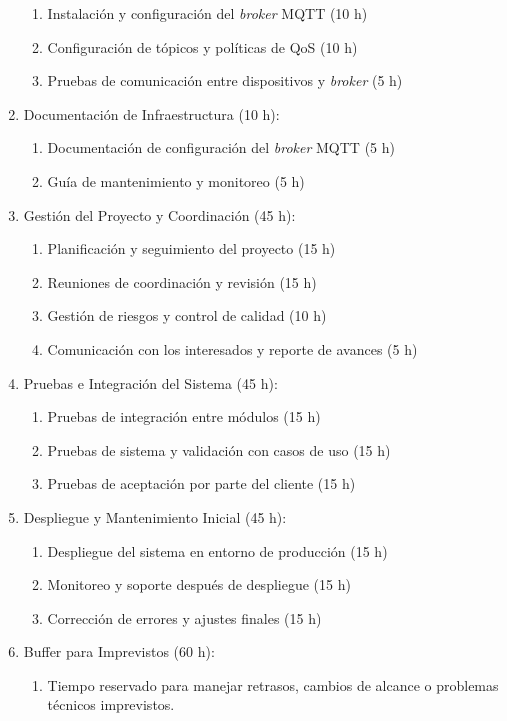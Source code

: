 \documentclass[
11pt, %
]{charter}
\begin{document}
\begin{enumerate}
\begin{enumerate}
\item Instalación y configuración del  \textit{broker} MQTT (10 h)
\item Configuración de tópicos y políticas de QoS (10 h)
\item Pruebas de comunicación entre dispositivos y  \textit{broker} (5 h)
\end{enumerate}
\item Documentación de Infraestructura (10 h):
\begin{enumerate}
\item Documentación de configuración del  \textit{broker} MQTT (5 h)
\item Guía de mantenimiento y monitoreo (5 h)
\end{enumerate}
\item Gestión del Proyecto y Coordinación (45 h):
\begin{enumerate}
\item Planificación y seguimiento del proyecto (15 h)
\item Reuniones de coordinación y revisión (15 h)
\item Gestión de riesgos y control de calidad (10 h)
\item Comunicación con los interesados y reporte de avances (5 h)
\end{enumerate}
\item Pruebas e Integración del Sistema (45 h):
\begin{enumerate}
\item Pruebas de integración entre módulos (15 h)
\item Pruebas de sistema y validación con casos de uso (15 h)
\item Pruebas de aceptación por parte del cliente (15 h)
\end{enumerate}
\item Despliegue y Mantenimiento Inicial (45 h):
\begin{enumerate}
\item Despliegue del sistema en entorno de producción (15 h)
\item Monitoreo y soporte después de despliegue (15 h)
\item Corrección de errores y ajustes finales (15 h)
\end{enumerate}
\item Buffer para Imprevistos (60 h):
\begin{enumerate}
\item Tiempo reservado para manejar retrasos, cambios de alcance o problemas técnicos imprevistos.
\end{enumerate}
\end{enumerate}
\end{document}

